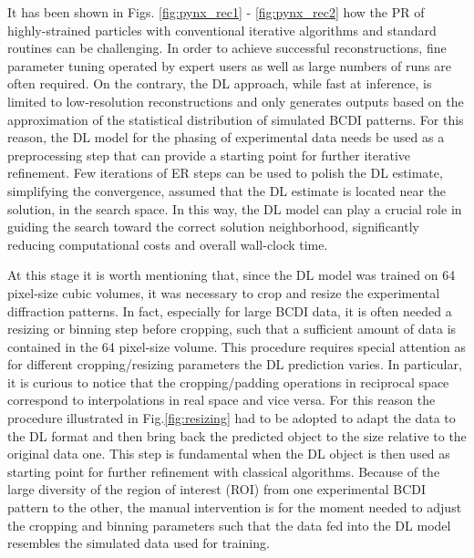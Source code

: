 It has been shown in Figs. \ref{fig:pynx_rec1} - \ref{fig:pynx_rec2} how the PR of highly-strained particles with 
conventional iterative algorithms and standard routines can be challenging. In order to achieve successful reconstructions, 
fine parameter tuning operated by expert users as well as large numbers of runs are often required. On the contrary, 
the DL approach, while fast at inference, is limited to low-resolution reconstructions and only generates outputs 
based on the approximation of the statistical distribution of simulated BCDI patterns. For this reason, the DL model 
for the phasing of experimental data needs be used as a preprocessing step that can provide 
a starting point for further iterative refinement. Few iterations of ER steps can be used to polish the DL estimate, simplifying 
the convergence, assumed that the DL estimate is located near the solution, in the search space. In this way, the DL model 
can play a crucial role in guiding the search toward the correct solution neighborhood, significantly reducing 
computational costs and overall wall-clock time.

At this stage it is worth mentioning that, since the DL model was trained on 64 pixel-size cubic volumes, it was necessary 
to crop and resize the experimental diffraction patterns. In fact, especially for large BCDI data, it is often needed a 
resizing or binning step before cropping, such that a sufficient amount of data is contained in the 64 pixel-size 
volume. This procedure requires special attention as for different 
cropping/resizing parameters the DL prediction varies. In particular, it is curious to notice that the cropping/padding 
operations in reciprocal space correspond to interpolations in real space and vice versa. For this reason the procedure 
illustrated in Fig.\ref{fig:resizing} had to be adopted to adapt the data to the DL format and then bring back 
the predicted object to the size relative to the original data one. This step is fundamental when the DL object is then 
used as starting point for further refinement with classical algorithms.  
Because of the large diversity of the region of interest (ROI) from one experimental BCDI pattern to the other, the manual 
intervention is for the moment needed to adjust the cropping and binning parameters such that the data fed into the DL 
model resembles the simulated data used for training.

